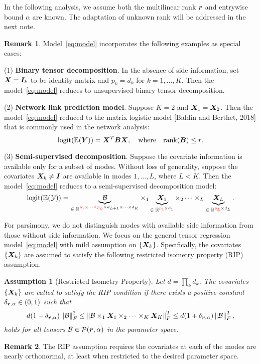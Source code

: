 \documentclass[11pt]{article}
\theoremstyle{plain}
\newtheorem{ass}{Assumption}
\theoremstyle{definition}
\newtheorem{rmk}{Remark}
\newcommand*{\KeepStyleUnderBrace}[1]{%
  \mathop{%
    \mathchoice
    {\underbrace{\displaystyle#1}}%
    {\underbrace{\textstyle#1}}%
    {\underbrace{\scriptstyle#1}}%
    {\underbrace{\scriptscriptstyle#1}}%
  }\limits
}
\begin{document}
In the following analysis, we assume both the multilinear rank $\bm{r}$ and entrywise bound $\alpha$ are known. The adaptation of unknown rank will be addressed in the next note. 

\begin{rmk}
Model~\eqref{eq:model} incorporates the following examples as special cases:

(1) {\bf Binary tensor decomposition}. In the absence of side information, set $\bm X=\bm I_k$ to be identity matrix and $p_k=d_k$ for $k=1,\ldots,K$. Then the model~\eqref{eq:model} reduces to unsupervised binary tensor decomposition.

(2) {\bf Network link prediction model}. Suppose $K=2$ and $\bm X_1=\bm X_2$. Then the model~\eqref{eq:model} reduced to the matrix logistic model [Baldin and Berthet, 2018] that is commonly used in the network analysis:
\[
\text{logit}(\mathbb{E}(\bm Y))=\bm X^T\bm B\bm X,\quad \text{where}\quad \text{rank}(\bm B)\leq r. 
\]

(3) {\bf Semi-supervised decomposition}. Suppose the covariate information is available only for a subset of modes. Without loss of generality, suppose the covariates $\bm X_k\neq \bm I$ are available in modes $1,\ldots,L$, where $L< K$. Then the model~\eqref{eq:model} reduces to a semi-supervised decomposition model:
\[
\text{logit}(\mathbb{E}(\tY))=\KeepStyleUnderBrace{\tB}_{\text{$\in\mathbb{R}^{{\color{red}p_1\times \cdots\times p_L}\times d_{L+1}\times \cdots \times  d_K}$}} \times_1 \KeepStyleUnderBrace{\mX_1}_{\text{$\in \mathbb{R}^{{\color{red}p_1}\times d_1}$}}\times_2\cdots\times_L\KeepStyleUnderBrace{\mX_L}_{\text{$\in \mathbb{R}^{{\color{red}p_L}\times d_L}$}}.
\] 
\end{rmk}

For parsimony, we do not distinguish modes with available side information from those without side information. We focus on the general tensor regression model~\eqref{eq:model} with mild assumption on $\{\bm X_k\}$. Specifically, the covariates $\{\bm X_k\}$ are assumed to satisfy the following restricted isometry property (RIP) assumption. 

\begin{ass}[Restricted Isometry Property]\label{ass:RIP}
Let $d=\prod_k d_k$. The covariates $\{\bm X_k\}$ are called to satisfy the RIP condition if there exists a positive constant $\delta_{\bm{r},\alpha}\in(0,1)$ such that 
\[
d(1-\delta_{\bm{r},\alpha})\left\lVert\mathcal{B}\right\rVert_F^2\leq \left\lVert\mathcal{B} \times_1\bm X_1\times_2\cdots\times_K\bm X_K\right\rVert_F^2\leq d(1+\delta_{\bm{r},\alpha})\left\lVert\mathcal{B}\right\rVert_F^2,
\]
holds for all tensors $\mathcal{B}\in \mathcal{P}(\bm{r},\alpha)$ in the parameter space. 
\end{ass}
\begin{rmk}
The RIP assumption requires the covariates at each of the modes are nearly orthonormal, at least when restricted to the desired parameter space. 
\end{rmk}
\end{document}
